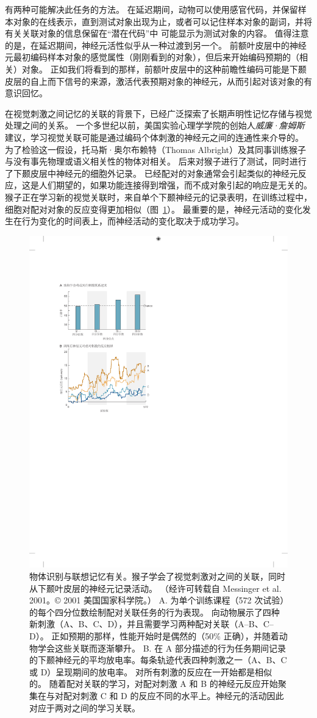 有两种可能解决此任务的方法。
在延迟期间，动物可以使用感官代码，并保留样本对象的在线表示，直到测试对象出现为止，或者可以记住样本对象的副词，并将有关关联对象的信息保留在“潜在代码”中 可能显示为测试对象的内容。
值得注意的是，在延迟期间，神经元活性似乎从一种过渡到另一个。
前额叶皮层中的神经元最初编码样本对象的感觉属性（刚刚看到的对象），但后来开始编码预期的（相关）对象。 
正如我们将看到的那样，前额叶皮层中的这种前瞻性编码可能是下颞皮层的自上而下信号的来源，激活代表预期对象的神经元，从而引起对该对象的有意识回忆。


在视觉刺激之间记忆的关联的背景下，已经广泛探索了长期声明性记忆存储与视觉处理之间的关系。
一个多世纪以前，美国实验心理学学院的创始人\textit{威廉·詹姆斯}建议，学习视觉关联可能是通过编码个体刺激的神经元之间的连通性来介导的。 为了检验这一假设，托马斯·奥尔布赖特（Thomas Albright）及其同事训练猴子与没有事先物理或语义相关性的物体对相关。
后来对猴子进行了测试，同时进行了下颞皮层中神经元的细胞外记录。
已经配对的对象通常会引起类似的神经元反应，这是人们期望的，如果功能连接得到增强，而不成对象引起的响应是无关的。
猴子正在学习新的视觉关联时，来自单个下颞神经元的记录表明，在训练过程中，细胞对配对对象的反应变得更加相似（图~\ref{fig:24_12}）。
最重要的是，神经元活动的变化发生在行为变化的时间表上，而神经活动的变化取决于成功学习。


\begin{figure}[htbp]
	\centering
	\includegraphics[width=0.5\linewidth]{chap24/fig_24_12}
	\caption{物体识别与联想记忆有关。猴子学会了视觉刺激对之间的关联，同时从下颞叶皮层的神经元记录活动。 （经许可转载自 Messinger et al. 2001。© 2001 美国国家科学院。） A. 为单个训练课程（572 次试验）的每个四分位数绘制配对关联任务的行为表现。 向动物展示了四种新刺激（A、B、C、D），并且需要学习两种配对关联（A–B、C–D）。 正如预期的那样，性能开始时是偶然的（50\% 正确），并随着动物学会这些关联而逐渐攀升。 B. 在 A 部分描述的行为任务期间记录的下颞神经元的平均放电率。每条轨迹代表四种刺激之一（A、B、C 或 D）呈现期间的放电率。 对所有刺激的反应在一开始都是相似的。 随着配对关联的学习，对配对刺激 A 和 B 的神经元反应开始聚集在与对配对刺激 C 和 D 的反应不同的水平上。神经元的活动因此对应于两对之间的学习关联。}
	\label{fig:24_12}
\end{figure}


